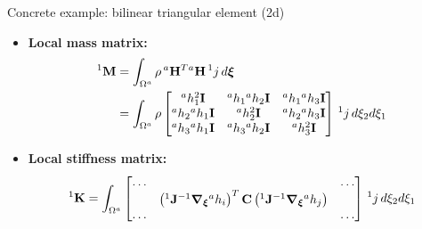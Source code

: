 \documentclass[aspectratio=169]{beamer}
\begin{document}
{  \begin{frame}{Concrete example: bilinear triangular element (2d)}
      \begin{itemize}
          \item\textbf{Local mass matrix:}
                \begin{align*}
                    {}^1\mathbf M & =\int_{\Omega^a} \rho\, {}^a\mathbf H^T{}^a\mathbf H \, {}^1j \, d\boldsymbol\xi                                 \\
                                  & = \int_{\Omega^a} \rho\begin{bmatrix}
                                                              {}^a h_1^2 \mathbf I      & {}^a h_1{}^a h_2 \mathbf I & {}^a h_1{}^a h_3 \mathbf I \\
                                                              {}^ah_2{}^a h_1 \mathbf I & {}^a h_2^2 \mathbf I       & {}^a h_2{}^a h_3 \mathbf I \\
                                                              {}^ah_3{}^a h_1 \mathbf I & {}^a h_3{}^a h_2 \mathbf I & {}^a h_3^2 \mathbf I       \\
                                                          \end{bmatrix} \, {}^1j \, d\xi_2d\xi_1
                \end{align*}

          \item \textbf{Local stiffness matrix:}
                $$
                    {}^1\mathbf K = \int_{\Omega^a} \begin{bmatrix}
                        \dots &                                                                                                                                                      & \dots \\
                              & \left({}^1\mathbf J^{-1}\boldsymbol{\nabla}_{\boldsymbol\xi}{}^ah_i \right)^T\mathbf C\left( {}^1\mathbf J^{-1}\boldsymbol{\nabla}_{\boldsymbol\xi}{}^ah_j \right) &       \\
                        \dots &                                                                                                                                                      & \dots \\
                    \end{bmatrix} \, {}^1j \, d\xi_2d\xi_1
                $$
      \end{itemize}
  \end{frame}

}
\end{document}
